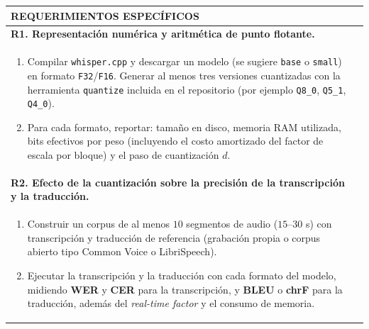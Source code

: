\documentclass[12pt]{article}
\begin{document}
\newpage
\noindent
\begin{longtable}{|p{\textwidth}|@{}c@{}}
  \hline
  \centering\cellcolor{cyan}\textbf{\color{white}REQUERIMIENTOS ESPECÍFICOS}&\\\hline
  \endhead
  \textbf{R1. Representación numérica y aritmética de punto flotante.}&\\
  \begin{enumerate}[label=\alph*)]\setlength\itemsep{0pt}
  \item Compilar \texttt{whisper.cpp} y descargar un modelo (se sugiere \texttt{base} o \texttt{small}) en
  formato \texttt{F32}/\texttt{F16}. Generar al menos tres versiones cuantizadas con la herramienta
  \texttt{quantize} incluida en el repositorio (por ejemplo \texttt{Q8\_0}, \texttt{Q5\_1}, \texttt{Q4\_0}).
  \item Para cada formato, reportar: tamaño en disco, memoria RAM utilizada, bits efectivos por peso
  (incluyendo el costo amortizado del factor de escala por bloque) y el paso de cuantización $d$.
  \end{enumerate}&\\
  \textbf{R2. Efecto de la cuantización sobre la precisión de la transcripción y la traducción.}&\\
  \begin{enumerate}[label=\alph*)]\setlength\itemsep{0pt}
  \item Construir un corpus de al menos $10$ segmentos de audio ($15$--$30$ s) con transcripción y
  traducción de referencia (grabación propia o corpus abierto tipo Common Voice o LibriSpeech).
  \item Ejecutar la transcripción y la traducción con cada formato del modelo, midiendo
  \textbf{WER} y \textbf{CER} para la transcripción, y \textbf{BLEU} o \textbf{chrF} para la traducción,
  además del \textit{real-time factor} y el consumo de memoria.

\end{enumerate}
\end{longtable}
\end{document}
